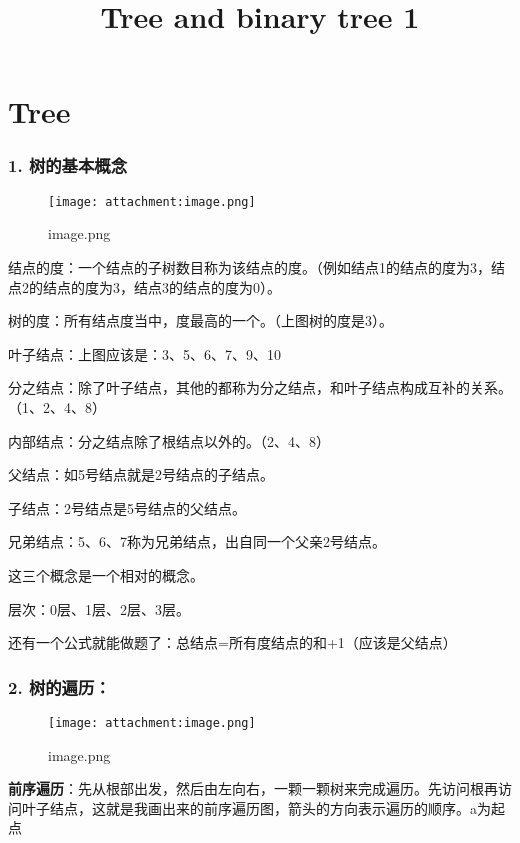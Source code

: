 \documentclass[11pt]{article}
\title{Tree and binary tree 1}
\makeatletter
\def\maxwidth{\ifdim\Gin@nat@width>\linewidth\linewidth
    \else\Gin@nat@width\fi}
\let\Oldincludegraphics\includegraphics
\renewcommand{\includegraphics}[1]{\Oldincludegraphics[width=.8\maxwidth]{#1}}
\makeatother
\begin{document}
    
    
    \maketitle
    
    

    
    \section{Tree}\label{tree}

    \subsubsection{1.
树的基本概念}\label{ux6811ux7684ux57faux672cux6982ux5ff5}

    \begin{figure}
\centering
\texttt{[image: attachment:image.png]}
\caption{image.png}
\end{figure}

    结点的度：一个结点的子树数目称为该结点的度。（例如结点1的结点的度为3，结点2的结点的度为3，结点3的结点的度为0）。

树的度：所有结点度当中，度最高的一个。（上图树的度是3）。

叶子结点：上图应该是：3、5、6、7、9、10

分之结点：除了叶子结点，其他的都称为分之结点，和叶子结点构成互补的关系。（1、2、4、8）

内部结点：分之结点除了根结点以外的。（2、4、8）

父结点：如5号结点就是2号结点的子结点。

子结点：2号结点是5号结点的父结点。

兄弟结点：5、6、7称为兄弟结点，出自同一个父亲2号结点。

这三个概念是一个相对的概念。

层次：0层、1层、2层、3层。

还有一个公式就能做题了：总结点=所有度结点的和+1（应该是父结点）

    \subsubsection{2. 树的遍历：}\label{ux6811ux7684ux904dux5386}

    \begin{figure}
\centering
\texttt{[image: attachment:image.png]}
\caption{image.png}
\end{figure}

\textbf{前序遍历}：先从根部出发，然后由左向右，一颗一颗树来完成遍历。先访问根再访问叶子结点，这就是我画出来的前序遍历图，箭头的方向表示遍历的顺序。a为起点
\end{document}
